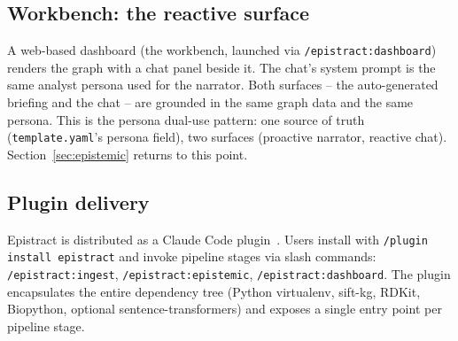 \subsection{Workbench: the reactive surface}

A web-based dashboard (the workbench, launched via \texttt{/epistract:dashboard}) renders the graph with a chat panel beside it. The chat's system prompt is the same analyst persona used for the narrator. Both surfaces -- the auto-generated briefing and the chat -- are grounded in the same graph data and the same persona. This is the persona dual-use pattern: one source of truth (\texttt{template.yaml}'s persona field), two surfaces (proactive narrator, reactive chat). Section~\ref{sec:epistemic} returns to this point.

\subsection{Plugin delivery}

Epistract is distributed as a Claude Code plugin~\cite{claudecode2024}. Users install with \texttt{/plugin install epistract} and invoke pipeline stages via slash commands: \texttt{/epistract:ingest}, \texttt{/epistract:epistemic}, \texttt{/epistract:dashboard}. The plugin encapsulates the entire dependency tree (Python virtualenv, sift-kg, RDKit, Biopython, optional sentence-transformers) and exposes a single entry point per pipeline stage.
